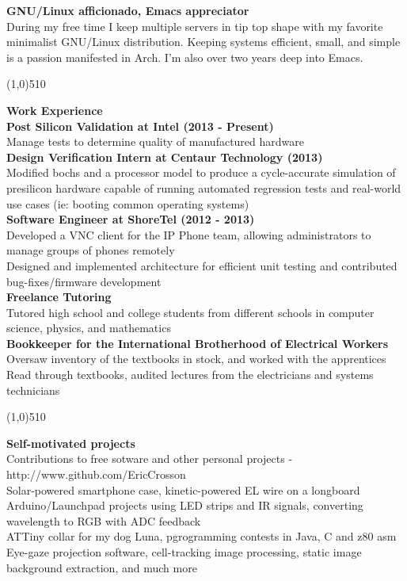 \documentclass{report}
\newcommand{\cut}{\begin{center} \line(1,0){510} \end{center}}
\begin{document}
\textbf{GNU/Linux afficionado, Emacs appreciator} \\
During my free time I keep multiple servers in tip top shape with my
favorite minimalist GNU/Linux distribution. Keeping systems
efficient, small, and simple is a passion manifested in Arch. I'm also
over two years deep into Emacs.

\cut{}

\textbf{Work Experience} \\
\textbf{Post Silicon Validation at Intel (2013 - Present)} \\
Manage tests to determine quality of manufactured hardware \\

\textbf{Design Verification Intern at Centaur Technology (2013)} \\
Modified bochs and a processor model to produce a cycle-accurate
simulation of presilicon hardware capable of running automated
regression tests and real-world use cases (ie: booting common
operating systems) \\

\textbf{Software Engineer at ShoreTel (2012 - 2013)} \\
Developed a VNC client for the IP Phone team, allowing
administrators to manage groups of phones remotely \\
Designed and implemented architecture for efficient unit testing and
contributed bug-fixes/firmware development \\

\textbf{Freelance Tutoring} \\
Tutored high school and college students from different schools in
computer science, physics, and mathematics \\

\textbf{Bookkeeper for the International Brotherhood of Electrical Workers} \\
Oversaw inventory of the textbooks in stock, and worked with the
apprentices \\
Read through textbooks, audited lectures from the electricians and
systems technicians

\cut

\textbf{Self-motivated projects} \\
Contributions to free sotware and other personal projects - http://www.github.com/EricCrosson \\
Solar-powered smartphone case, kinetic-powered EL wire on a longboard \\
Arduino/Launchpad projects using LED strips and IR signals, converting
wavelength to RGB with ADC feedback \\
ATTiny collar for my dog Luna, pgrogramming contests in Java, C and z80 asm \\
Eye-gaze projection software, cell-tracking image processing, static image
background extraction, and much more \\
\end{document}
